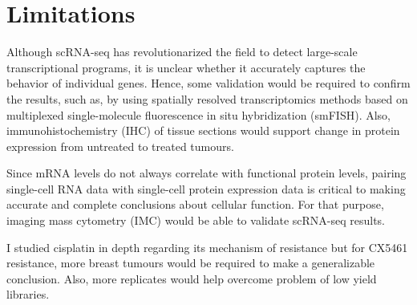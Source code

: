 

\section{Limitations}

Although scRNA-seq has revolutionarized the field to detect large-scale transcriptional programs, it is unclear whether it accurately captures the behavior of individual genes. Hence, some validation would be required to confirm the results, such as, by using spatially resolved transcriptomics methods based on multiplexed single-molecule fluorescence in situ hybridization (smFISH). Also, immunohistochemistry (IHC) of tissue sections would support change in protein expression from untreated to treated tumours.

Since mRNA levels do not always correlate with functional protein levels, pairing single-cell RNA data with single-cell protein expression data is critical to making accurate and complete conclusions about cellular function.
For that purpose, imaging mass cytometry (IMC) would be able to validate scRNA-seq results.

I studied cisplatin in depth regarding its mechanism of resistance but for CX5461 resistance, more breast tumours would be required to make a generalizable conclusion. Also, more replicates would help overcome problem of low yield libraries.













